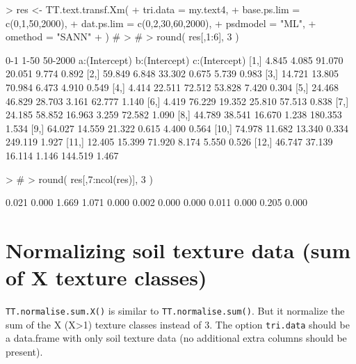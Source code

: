 \documentclass[a4paper]{article}
\begin{document}
\begin{Schunk}
\begin{Sinput}
> res <- TT.text.transf.Xm(
+     tri.data    = my.text4,
+     base.ps.lim = c(0,1,50,2000),
+     dat.ps.lim  = c(0,2,30,60,2000),
+     psdmodel    = "ML",
+     omethod     = "SANN"
+ )   #
> #
> round( res[,1:6], 3 ) 
\end{Sinput}
\begin{Soutput}
         0-1   1-50 50-2000 a:(Intercept) b:(Intercept) c:(Intercept)
 [1,]  4.845  4.085  91.070        20.051         9.774         0.892
 [2,] 59.849  6.848  33.302         0.675         5.739         0.983
 [3,] 14.721 13.805  70.984         6.473         4.910         0.549
 [4,]  4.414 22.511  72.512        53.828         7.420         0.304
 [5,] 24.468 46.829  28.703         3.161        62.777         1.140
 [6,]  4.419 76.229  19.352        25.810        57.513         0.838
 [7,] 24.185 58.852  16.963         3.259        72.582         1.090
 [8,] 44.789 38.541  16.670         1.238       180.353         1.534
 [9,] 64.027 14.559  21.322         0.615         4.400         0.564
[10,] 74.978 11.682  13.340         0.334       249.119         1.927
[11,] 12.405 15.399  71.920         8.174         5.550         0.526
[12,] 46.747 37.139  16.114         1.146       144.519         1.467
\end{Soutput}
\begin{Sinput}
> #
> round( res[,7:ncol(res)], 3 ) 
\end{Sinput}
\begin{Soutput}
 [1] 0.021 0.000 1.669 1.071 0.000 0.002 0.000 0.000 0.011 0.000 0.205 0.000
\end{Soutput}
\end{Schunk}



\section{Normalizing soil texture data (sum of X texture classes)}


\texttt{TT.normalise.sum.X()} is similar to 
\texttt{TT.normalise.sum()}. But it normalize the sum of the X (X>1)
texture classes instead of 3. The option \texttt{tri.data} should be
a data.frame with only soil texture data (no additional extra
columns should be present).
\end{document}
